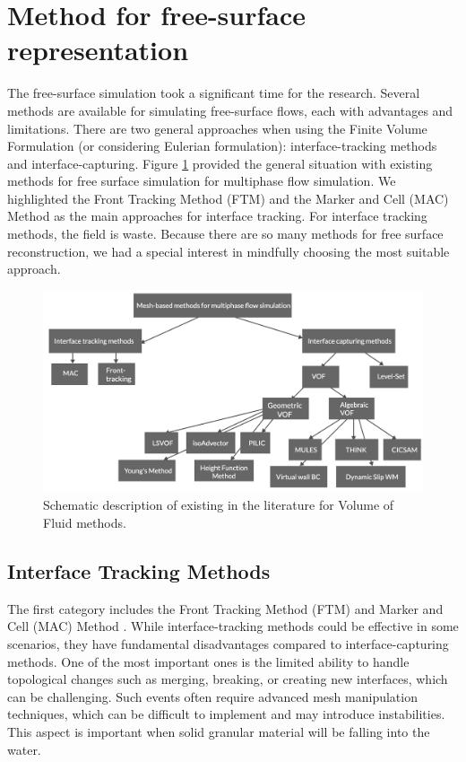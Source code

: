 \section{Method for free-surface representation} %

The free-surface simulation took a significant time for the research. Several methods are available for simulating free-surface flows, each with advantages and limitations. There are two general approaches when using the Finite Volume Formulation (or considering Eulerian formulation): interface-tracking methods and interface-capturing. Figure \ref{fig:vof_methods} provided the general situation with existing methods for free surface simulation for multiphase flow simulation. We highlighted the Front Tracking Method (FTM)\cite{front-tracking} and the Marker and Cell (MAC) Method \cite{mac} as the main approaches for interface tracking. For interface tracking methods, the field is waste. Because there are so many methods for free surface reconstruction, we had a special interest in mindfully choosing the most suitable approach.

\begin{figure}[!ht]
    \centering
    \includegraphics[width=16cm]{GWU_Thesis_Sarmakeeva/Images/chap1/VOF_methods.png}
    \caption{Schematic description of existing in the literature for Volume of Fluid methods.}
    \label{fig:vof_methods}
\end{figure}


\subsection{Interface Tracking Methods}

The first category includes the Front Tracking Method (\ac{FTM})\cite{front-tracking} and Marker and Cell (\ac{MAC}) Method \cite{mac}. While interface-tracking methods could be effective in some scenarios, they have fundamental disadvantages compared to interface-capturing methods. One of the most important ones is the limited ability to handle topological changes such as merging, breaking, or creating new interfaces, which can be challenging. Such events often require advanced mesh manipulation techniques, which can be difficult to implement and may introduce instabilities. This aspect is important when solid granular material will be falling into the water.

